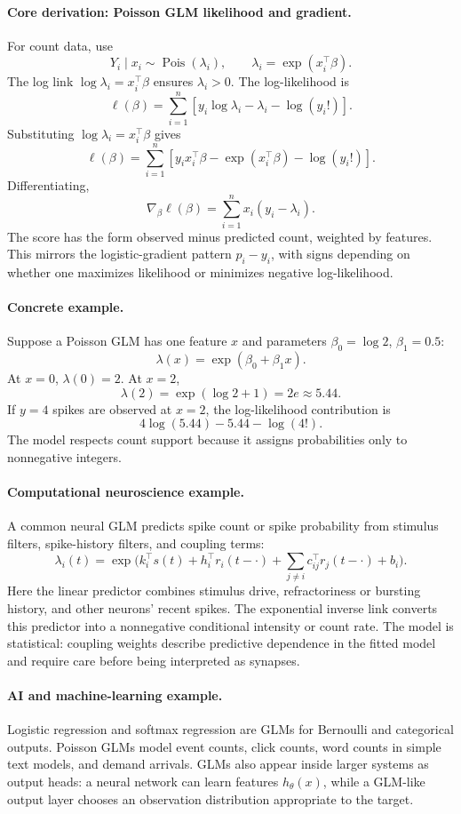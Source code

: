 \paragraph{Core derivation: Poisson GLM likelihood and gradient.}
For count data, use
\[
Y_i\mid x_i\sim\operatorname{Pois}(\lambda_i),
\qquad
\lambda_i=\exp(x_i^\top\beta).
\]
The log link \(\log\lambda_i=x_i^\top\beta\) ensures \(\lambda_i>0\). The log-likelihood is
\[
\ell(\beta)
=\sum_{i=1}^n
\left[
y_i\log\lambda_i-\lambda_i-\log(y_i!)
\right].
\]
Substituting \(\log\lambda_i=x_i^\top\beta\) gives
\[
\ell(\beta)
=\sum_{i=1}^n
\left[
y_i x_i^\top\beta-\exp(x_i^\top\beta)-\log(y_i!)
\right].
\]
Differentiating,
\[
\boxed{
\nabla_\beta \ell(\beta)
=\sum_{i=1}^n x_i\left(y_i-\lambda_i\right).
}
\]
The score has the form observed minus predicted count, weighted by features. This mirrors the logistic-gradient pattern \(p_i-y_i\), with signs depending on whether one maximizes likelihood or minimizes negative log-likelihood.

\paragraph{Concrete example.}
Suppose a Poisson GLM has one feature \(x\) and parameters \(\beta_0=\log 2\), \(\beta_1=0.5\):
\[
\lambda(x)=\exp(\beta_0+\beta_1x).
\]
At \(x=0\), \(\lambda(0)=2\). At \(x=2\),
\[
\lambda(2)=\exp(\log 2+1)=2e\approx5.44.
\]
If \(y=4\) spikes are observed at \(x=2\), the log-likelihood contribution is
\[
4\log(5.44)-5.44-\log(4!).
\]
The model respects count support because it assigns probabilities only to nonnegative integers.

\paragraph{Computational neuroscience example.}
A common neural GLM predicts spike count or spike probability from stimulus filters, spike-history filters, and coupling terms:
\[
\lambda_i(t)=\exp\bigl(k_i^\top s(t)+h_i^\top r_i(t-\cdot)+\sum_{j\neq i}c_{ij}^\top r_j(t-\cdot)+b_i\bigr).
\]
Here the linear predictor combines stimulus drive, refractoriness or bursting history, and other neurons' recent spikes. The exponential inverse link converts this predictor into a nonnegative conditional intensity or count rate. The model is statistical: coupling weights describe predictive dependence in the fitted model and require care before being interpreted as synapses.

\paragraph{AI and machine-learning example.}
Logistic regression and softmax regression are GLMs for Bernoulli and categorical outputs. Poisson GLMs model event counts, click counts, word counts in simple text models, and demand arrivals. GLMs also appear inside larger systems as output heads: a neural network can learn features \(h_\theta(x)\), while a GLM-like output layer chooses an observation distribution appropriate to the target.

